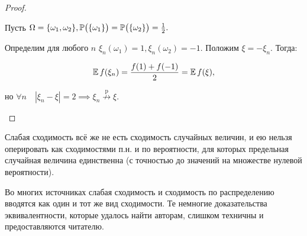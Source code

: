 \begin{proof}
\begin{compactlist}
        Пусть $\Omega = \{\omega_1, \omega_2 \}, \operatorname{\mathbb{P}}\bigl(\{\omega_1\}\bigr) = \operatorname{\mathbb{P}}\bigl(\{\omega_2\}\bigr) = \frac{1}{2}.$ 
        
        Определим для любого $n$ $\xi_n(\omega_1) = 1, \xi_n(\omega_2) = -1.$ 
        Положим $\xi = -\xi_n.$ Тогда:
        
        \begin{equation*}
            \operatorname{\mathbb{E}} f(\xi_n) = \frac{f(1) + f(-1)}{2} = \operatorname{\mathbb{E}} f(\xi),
        \end{equation*}

        но $\forall n \quad |\xi_n - \xi| = 2 \implies \xi_n \overset{\text{p}}{\nrightarrow} \xi.$
        \qedhere
\end{compactlist}
\end{proof}

\begin{rmrk}
    Слабая сходимость всё же не есть сходимость случайных величин, и ею нельзя оперировать как сходимостями п.н. и по вероятности, для которых предельная случайная величина единственна (с точностью до значений на множестве нулевой вероятности).
\end{rmrk}

\begin{rmrk}
    Во многих источниках слабая сходимость и сходимость по распределению вводятся как один и тот же вид сходимости. Те немногие доказательства эквивалентности, которые удалось найти авторам, слишком техничны и предоставляются читателю.
\end{rmrk}

